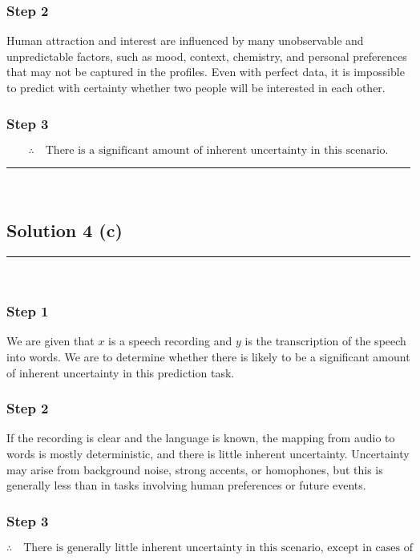 \documentclass{article}
\begin{document}
\subsubsection*{Step 2}
\parbox{\textwidth}{
Human attraction and interest are influenced by many unobservable and unpredictable factors, such as mood, context, chemistry, and personal preferences that may not be captured in the profiles. Even with perfect data, it is impossible to predict with certainty whether two people will be interested in each other.
}

\subsubsection*{Step 3}
\parbox{\textwidth}{
\[
\therefore \quad \text{There is a significant amount of inherent uncertainty in this scenario.}
\]
}

\noindent\rule{\textwidth}{0.4pt}\\

\newpage

\subsection*{Solution 4 (c)}
\noindent\rule{\textwidth}{0.4pt}\\

\subsubsection*{Step 1}
\parbox{\textwidth}{
We are given that $x$ is a speech recording and $y$ is the transcription of the speech into words. We are to determine whether there is likely to be a significant amount of inherent uncertainty in this prediction task.
}

\subsubsection*{Step 2}
\parbox{\textwidth}{
If the recording is clear and the language is known, the mapping from audio to words is mostly deterministic, and there is little inherent uncertainty. Uncertainty may arise from background noise, strong accents, or homophones, but this is generally less than in tasks involving human preferences or future events.
}

\subsubsection*{Step 3}
\parbox{\textwidth}{
\[
\therefore \quad \text{There is generally little inherent uncertainty in this scenario, except in cases of poor audio quality or ambiguity.}
\]
}
\end{document}
